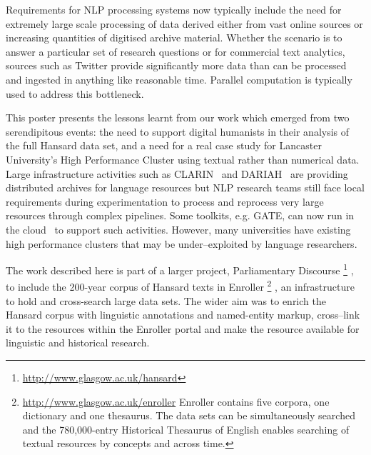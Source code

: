 Requirements for NLP processing systems now typically include the need for extremely large scale processing of data derived either from vast online sources or increasing quantities of digitised archive material. 
Whether the scenario is to answer a particular set of research questions or for commercial text analytics, sources such as Twitter provide significantly more data than can be processed and ingested in anything like reasonable time. Parallel computation is typically used to address this bottleneck.

This poster presents the lessons learnt from our work which emerged from two serendipitous events: the need to support digital humanists in their analysis of the full Hansard data set, and a need for a real case study for Lancaster University's High Performance Cluster using textual rather than numerical data. 
Large infrastructure activities such as CLARIN~\cite{varadi2008clarin} and DARIAH~\cite{constantopoulos2008preparing} are providing distributed archives for language resources but NLP research teams still face local requirements during experimentation to process and reprocess very large resources through complex pipelines. 
Some toolkits, e.g. GATE, can now run in the cloud~\cite{tablan2013gatecloud} to support such activities. However, many universities have existing high performance clusters that may be under--exploited by language researchers.  

The work described here is part of a larger project, Parliamentary Discourse%
\footnote{\url{http://www.glasgow.ac.uk/hansard}}%
, to include the 200-year corpus of Hansard texts in Enroller%
\footnote{\url{http://www.glasgow.ac.uk/enroller} Enroller contains five corpora, one dictionary and one thesaurus. The data sets can be simultaneously searched and the 780,000-entry Historical Thesaurus of English enables searching of textual resources by concepts and across time.}%
, an infrastructure to hold and cross-search large data sets. The wider aim was to enrich the Hansard corpus with linguistic annotations and named-entity markup, cross--link it to the resources within the Enroller portal and make the resource available for linguistic and historical research. 

